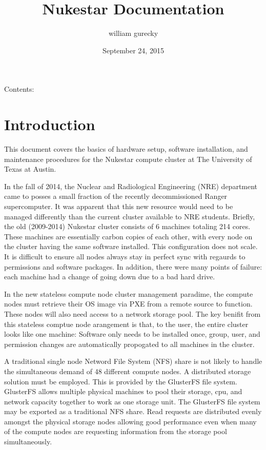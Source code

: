 \documentclass[letterpaper,10pt,english]{sphinxmanual}
\title{Nukestar Documentation}
\date{September 24, 2015}
\author{william gurecky}
\begin{document}
\maketitle
\tableofcontents
{}\label{index::doc}


Contents:


\chapter{Introduction}
\label{intro:introduction}\label{intro:welcome-to-nukestar-s-documentation}\label{intro::doc}
This document covers the basics of hardware setup, software installation, and maintenance
procedures for the Nukestar compute cluster at The University of Texas at Austin.

In the fall of 2014, the Nuclear and Radiological Engineering (NRE) department came to
posses a small fraction of the recently decommissioned Ranger supercomputer.  It was
apparent that this new resource would need to be managed differently than the current
cluster available to NRE students.  Briefly, the old (2009-2014) Nukestar cluster consists of
6 machines totaling 214 cores.  These machines are essentially carbon copies of each other,
with every node on the cluster having the same software installed.  This configuration does
not scale. It is difficult to ensure all nodes always stay in perfect sync with regaurds to permissions and
software packages.  In addition, there were many points of failure: each machine had a change of
going down due to a bad hard drive.

In the new stateless compute node cluster management paradime, the compute nodes must retrieve their OS image via
PXE from a remote source to function.  These nodes will also need access to a
network storage pool.  The key benifit from this stateless comptue node arangement is that, to the user,
the entire cluster looks like one machine: Software only needs to be installed once, group, user, and
permission changes are automatically propogated to all machines in the cluster.

A traditional single node Netword File System (NFS) share is not likely to handle the simultaneous demand of 48 different
compute nodes.  A distributed storage solution must be employed.  This is provided by the
GlusterFS file system.  GlusterFS allows multiple physical machines to pool their storage, cpu,
and network capacity together to work as one storage unit.  The GlusterFS file system may
be exported as a traditional NFS share.  Read requests are distributed evenly amongst the
physical storage nodes allowing good performance even when many of the compute nodes are
requesting information from the storage pool simultaneously.
\end{document}
